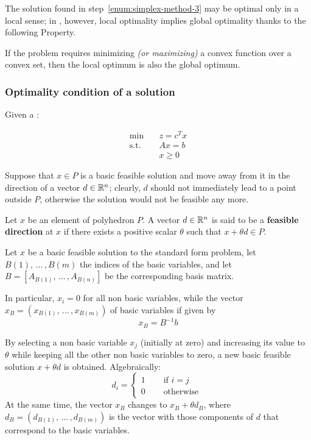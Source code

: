 \documentclass[english]{article}
\begin{document}
\bigskip
The solution found in step~\ref{enum:simplex-method-3} may be optimal only in a local sense;
in \LP, however, local optimality implies global optimality thanks to the following Property.

\begin{property}
  If the \LP problem requires minimizing \textit{(or maximizing)} a convex function over a convex set, then the local optimum is also the global optimum.
  \label{prop:optimal-vertex}
\end{property}

\subsubsection{Optimality condition of a \LP solution}

Given a \LP:

\begin{align*}
  \min \quad        & z = c^T x \\
  \text{s.t.} \quad & Ax = b    \\
                    & x \geq 0
\end{align*}

Suppose that \(x \in P\) is a basic feasible solution and move away from it in the direction of a vector \(d \in \mathbb{R}^n\);
clearly, \(d\) should not immediately lead to a point outside \(P\), otherwise the solution would not be feasible any more.

\begin{definition}
  \label{def:feasible-direction}
  Let \(x\) be an element of polyhedron \(P\).
  A vector \(d \in \mathbb{R}^n\) is said to be a \textbf{feasible direction} at \(x\) if there exists a positive scalar \(\theta\) such that \(x + \theta d \in P\).
\end{definition}

\bigskip
Let \(x\) be a basic feasible solution to the standard form problem, let \(B(1), \, \ldots \,, B(m)\) the indices of the basic variables, and let \(B = \left[ A_{B(1)}, \, \ldots \,, A_{B(n)} \right]\) be the corresponding basis matrix.

In particular, \(x_i = 0\) for all non basic variables, while the vector \(x_B = \left( x_{B(1)}, \, \ldots \,, x_{B(m)} \right)\) of basic variables if given by
\[x_B = B^{-1}b\]

By selecting a non basic variable \(x_j\) (initially at zero) and increasing its value to \(\theta\) while keeping all the other non basic variables to zero, a new basic feasible solution \(x + \theta d\) is obtained.
Algebraically:
\[ d_i = \begin{cases}
    1 \quad & \text{ if } i = j  \\
    0 \quad & \text{ otherwise }
  \end{cases} \]
At the same time, the vector \(x_B\) changes to \(x_B + \theta d_B\), where \(d_B = (d_{B(1)}, \, \ldots \,, d_{B(m)})\) is the vector with those components of \(d\) that correspond to the basic variables.
\end{document}
